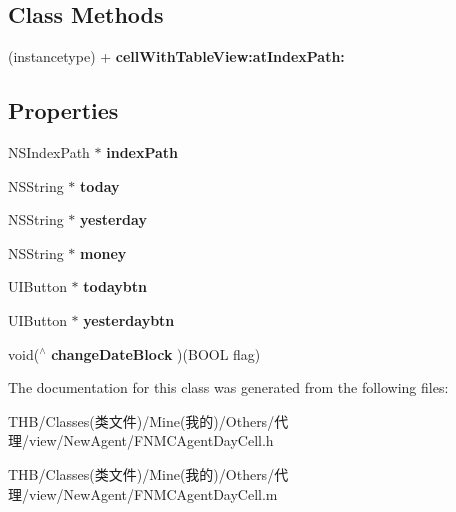 \subsection*{Class Methods}
\begin{DoxyCompactItemize}
\item 
\mbox{\label{interface_f_n_m_c_agent_day_cell_a1ea5d1e7490cd1a6a29cce140bd34ef8}} 
(instancetype) + {\bfseries cell\+With\+Table\+View\+:at\+Index\+Path\+:}
\end{DoxyCompactItemize}
\subsection*{Properties}
\begin{DoxyCompactItemize}
\item 
\mbox{\label{interface_f_n_m_c_agent_day_cell_afe71277d8824004b5d2032a3c1c30b60}} 
N\+S\+Index\+Path $\ast$ {\bfseries index\+Path}
\item 
\mbox{\label{interface_f_n_m_c_agent_day_cell_a8fbd7c54caf74ab7ab07691bbf59075d}} 
N\+S\+String $\ast$ {\bfseries today}
\item 
\mbox{\label{interface_f_n_m_c_agent_day_cell_ab8ec1d9e559a096b1ad97b006ada4c6d}} 
N\+S\+String $\ast$ {\bfseries yesterday}
\item 
\mbox{\label{interface_f_n_m_c_agent_day_cell_a5cffab518f602d7ba079d3cc67e68eb7}} 
N\+S\+String $\ast$ {\bfseries money}
\item 
\mbox{\label{interface_f_n_m_c_agent_day_cell_a6ec1761a7eed764baea8e13e359886c2}} 
U\+I\+Button $\ast$ {\bfseries todaybtn}
\item 
\mbox{\label{interface_f_n_m_c_agent_day_cell_a38f73a7d1daaafc7cb2f43ca6841663e}} 
U\+I\+Button $\ast$ {\bfseries yesterdaybtn}
\item 
\mbox{\label{interface_f_n_m_c_agent_day_cell_af108d4d9c38ee3a11c67b555dd89a6df}} 
void($^\wedge$ {\bfseries change\+Date\+Block} )(B\+O\+OL flag)
\end{DoxyCompactItemize}


The documentation for this class was generated from the following files\+:\begin{DoxyCompactItemize}
\item 
T\+H\+B/\+Classes(类文件)/\+Mine(我的)/\+Others/代理/view/\+New\+Agent/F\+N\+M\+C\+Agent\+Day\+Cell.\+h\item 
T\+H\+B/\+Classes(类文件)/\+Mine(我的)/\+Others/代理/view/\+New\+Agent/F\+N\+M\+C\+Agent\+Day\+Cell.\+m\end{DoxyCompactItemize}
